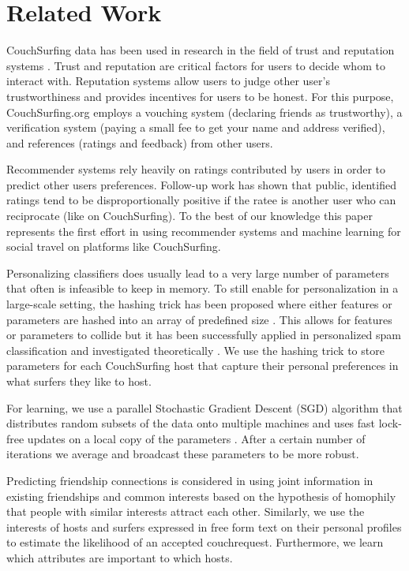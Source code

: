 \section{Related Work}



CouchSurfing data has been used in research in the field of trust and reputation systems \cite{lauterbach2009surfing}. Trust and reputation are critical factors for users to decide whom to interact with. Reputation systems allow users to judge other user's trustworthiness and provides incentives for users to be honest. For this purpose, CouchSurfing.org employs a vouching system (declaring friends as trustworthy), a verification system (paying a small fee to get your name and address verified), and references (ratings and feedback) from other users. 

Recommender systems rely heavily on ratings contributed by users in order to predict other users preferences. Follow-up work has shown that public, identified ratings tend to be disproportionally positive if the ratee is another user who can reciprocate \cite{teng2010rate} (like on CouchSurfing). 
To the best of our knowledge this paper represents the first effort in using recommender systems and machine learning for social travel on platforms like CouchSurfing.

Personalizing classifiers does usually lead to a very large number of parameters that often is infeasible to keep in memory. To still enable for personalization in a large-scale setting, the hashing trick has been proposed where either features or parameters are hashed into an array of predefined size \cite{Attenberg2009,Weinberger2012}. This allows for features or parameters to collide but it has been successfully applied in personalized spam classification \cite{Attenberg2009} and investigated theoretically \cite{Weinberger2012}. We use the hashing trick to store parameters for each CouchSurfing host that capture their personal preferences in what surfers they like to host.

For learning, we use a parallel Stochastic Gradient Descent (SGD) algorithm that distributes random subsets of the data onto multiple machines and uses fast lock-free updates on a local copy of the parameters \cite{Zinkevich2010}. After a certain number of iterations we average and broadcast these parameters to be more robust.

Predicting friendship connections is considered in \cite{Yang2011} using joint information in existing friendships and common interests based on the hypothesis of homophily that people with similar interests attract each other. Similarly, we use the interests of hosts and surfers expressed in free form text on their personal profiles to estimate the likelihood of an accepted couchrequest. Furthermore, we learn which attributes are important to which hosts.


